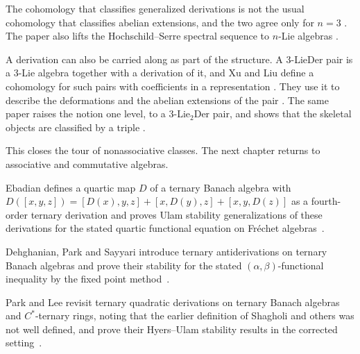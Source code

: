 The cohomology that classifies generalized derivations is not the usual
cohomology that classifies abelian extensions, and the two agree only for
$n=3$ \cite[p.~2]{AtesliEsenSutlu2021}. The paper also lifts the
Hochschild--Serre spectral sequence to $n$-Lie algebras
\cite[pp.~2--3]{AtesliEsenSutlu2021}.

A derivation can also be carried along as part of the structure. A 3-LieDer
pair is a 3-Lie algebra together with a derivation of it, and Xu and Liu define
a cohomology for such pairs with coefficients in a representation
\cite[p.~1]{XuLiu2021ThreeLieDer}. They use it to describe the deformations and
the abelian extensions of the pair \cite[p.~1]{XuLiu2021ThreeLieDer}. The same
paper raises the notion one level, to a 3-Lie$_2$Der pair, and shows that the skeletal
objects are classified by a triple \cite[p.~1]{XuLiu2021ThreeLieDer}.

This closes the tour of nonassociative classes. The next chapter returns to
associative and commutative algebras. %

Ebadian defines a quartic map $D$ of a ternary Banach algebra with $D([x,y,z])=[D(x),y,z]+[x,D(y),z]+[x,y,D(z)]$ as a fourth-order ternary derivation and proves Ulam stability generalizations of these derivations for the stated quartic functional equation on Fr\'echet algebras~\cite{WlUlamStabilityGeneralizationsOf2013}.

Dehghanian, Park and Sayyari introduce ternary antiderivations on ternary Banach algebras and prove their stability for the stated $(\alpha,\beta)$-functional inequality by the fixed point method~\cite{WlStabilityOfTernaryAntiderivati2023}.

Park and Lee revisit ternary quadratic derivations on ternary Banach algebras and $C^*$-ternary rings, noting that the earlier definition of Shagholi and others was not well defined, and prove their Hyers--Ulam stability results in the corrected setting~\cite{WlApproximateTernaryQuadraticDer2015}.
